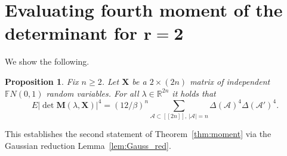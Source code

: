 \documentclass[pdftex]{sigma}
\numberwithin{equation}{section}
\newtheorem{Proposition}[Theorem]{Proposition}
\theoremstyle{definition}
\newcommand{\FF}{{\mathbb{F}}}
\newcommand{\R}{{\mathbb R}}
\newcommand{\cA}{\mathcal{A}}
\newcommand{\lst}[1]{[\![#1 ]\!]}
\newcommand{\mbf}[1]{\mathbf{#1}}
\begin{document}
\section[Evaluating fourth moment of the determinant for r=2]{Evaluating fourth moment of the determinant for $\boldsymbol{ r=2}$}
\label{sec:4moment}

 We show the following.

\begin{Proposition}\label{prop:det_l=4}
Fix $n\ge 2$. Let $\mbf{X}$ be a $2\times (2n)$ matrix of independent $\FF N(0,1)$ random variables.
For all ${\lambda}\in \R^{2n}$ it holds that
 \[%
 E |{\det \mbf{M}({\lambda}, \mbf{X})}|^4 = (12/\beta)^n \sum_{\cA\subset \lst{2n},\, |\cA|=n} \Delta (\cA)^4 \Delta(\cA')^4.
 \]
\end{Proposition}

This establishes the second statement of Theorem~\ref{thm:moment} via the Gaussian reduction Lemma~\ref{lem:Gauss_red}.
\end{document}
